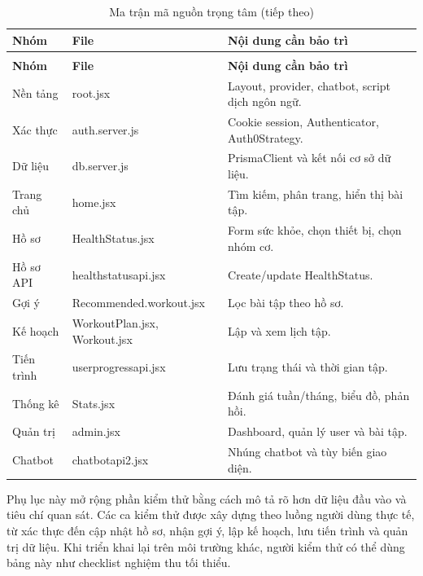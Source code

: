 
\begingroup
\setlength{\tabcolsep}{3pt}
\renewcommand{\arraystretch}{1.25}
\begin{longtable}{|P{0.220\textwidth}|P{0.330\textwidth}|P{0.370\textwidth}|}
\caption{Ma trận mã nguồn trọng tâm}\\
\hline
\textbf{Nhóm} & \textbf{File} & \textbf{Nội dung cần bảo trì} \\
\hline
\endfirsthead
\caption[]{Ma trận mã nguồn trọng tâm (tiếp theo)}\\
\hline
\textbf{Nhóm} & \textbf{File} & \textbf{Nội dung cần bảo trì} \\
\hline
\endhead
Nền tảng & root.jsx & Layout, provider, chatbot, script dịch ngôn ngữ. \\
\hline
Xác thực & auth.server.js & Cookie session, Authenticator, Auth0Strategy. \\
\hline
Dữ liệu & db.server.js & PrismaClient và kết nối cơ sở dữ liệu. \\
\hline
Trang chủ & home.jsx & Tìm kiếm, phân trang, hiển thị bài tập. \\
\hline
Hồ sơ & HealthStatus.jsx & Form sức khỏe, chọn thiết bị, chọn nhóm cơ. \\
\hline
Hồ sơ API & healthstatusapi.jsx & Create/update HealthStatus. \\
\hline
Gợi ý & Recommended.workout.jsx & Lọc bài tập theo hồ sơ. \\
\hline
Kế hoạch & WorkoutPlan.jsx, Workout.jsx & Lập và xem lịch tập. \\
\hline
Tiến trình & userprogressapi.jsx & Lưu trạng thái và thời gian tập. \\
\hline
Thống kê & Stats.jsx & Đánh giá tuần/tháng, biểu đồ, phản hồi. \\
\hline
Quản trị & admin.jsx & Dashboard, quản lý user và bài tập. \\
\hline
Chatbot & chatbotapi2.jsx & Nhúng chatbot và tùy biến giao diện. \\
\hline
\end{longtable}
\endgroup


Phụ lục này mở rộng phần kiểm thử bằng cách mô tả rõ hơn dữ liệu đầu vào và tiêu chí quan sát. Các ca kiểm thử được xây dựng theo luồng người dùng thực tế, từ xác thực đến cập nhật hồ sơ, nhận gợi ý, lập kế hoạch, lưu tiến trình và quản trị dữ liệu. Khi triển khai lại trên môi trường khác, người kiểm thử có thể dùng bảng này như checklist nghiệm thu tối thiểu.


